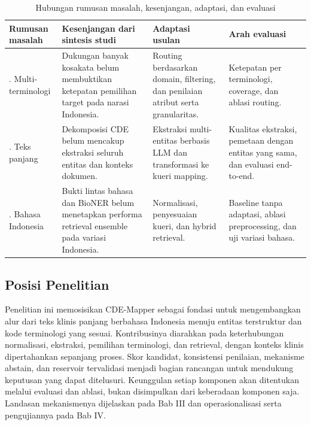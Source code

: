 \begin{table}[htbp]
\centering
\small
\setlength{\tabcolsep}{4pt}
\renewcommand{\arraystretch}{1.12}
\caption{Hubungan rumusan masalah, kesenjangan, adaptasi, dan evaluasi}
\label{tab:identifikasi-kesenjangan-penelitian}
\begin{tabularx}{\textwidth}{@{}>{\raggedright\arraybackslash}p{2.1cm} >{\raggedright\arraybackslash}X >{\raggedright\arraybackslash}X >{\raggedright\arraybackslash}X@{}}
\toprule
\textbf{Rumusan masalah} & \textbf{Kesenjangan dari sintesis studi} & \textbf{Adaptasi usulan} & \textbf{Arah evaluasi} \\
\midrule
1. Multi-terminologi & Dukungan banyak kosakata belum membuktikan ketepatan pemilihan target pada narasi Indonesia. & Routing berdasarkan domain, filtering, dan penilaian atribut serta granularitas. & Ketepatan per terminologi, coverage, dan ablasi routing. \\
\midrule
2. Teks panjang & Dekomposisi CDE belum mencakup ekstraksi seluruh entitas dan konteks dokumen. & Ekstraksi multi-entitas berbasis LLM dan transformasi ke kueri mapping. & Kualitas ekstraksi, pemetaan dengan entitas yang sama, dan evaluasi end-to-end. \\
\midrule
3. Bahasa Indonesia & Bukti lintas bahasa dan BioNER belum menetapkan performa retrieval ensemble pada variasi Indonesia. & Normalisasi, penyesuaian kueri, dan hybrid retrieval. & Baseline tanpa adaptasi, ablasi preprocessing, dan uji variasi bahasa. \\
\bottomrule
\end{tabularx}
\end{table}

\subsection{Posisi Penelitian}

Penelitian ini memosisikan CDE-Mapper sebagai fondasi untuk mengembangkan alur dari teks klinis panjang berbahasa Indonesia menuju entitas terstruktur dan kode terminologi yang sesuai. Kontribusinya diarahkan pada keterhubungan normalisasi, ekstraksi, pemilihan terminologi, dan retrieval, dengan konteks klinis dipertahankan sepanjang proses. Skor kandidat, konsistensi penilaian, mekanisme abstain, dan reservoir tervalidasi menjadi bagian rancangan untuk mendukung keputusan yang dapat ditelusuri. Keunggulan setiap komponen akan ditentukan melalui evaluasi dan ablasi, bukan disimpulkan dari keberadaan komponen saja. Landasan mekanismenya dijelaskan pada Bab III dan operasionalisasi serta pengujiannya pada Bab IV.

\begingroup
\makeatletter
\setlength{\@fptop}{0pt}
\makeatother
\clearpage
\endgroup



